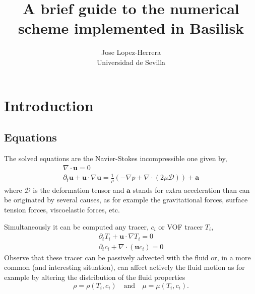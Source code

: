 \documentclass[a4paper]{report}
\begin{document}

\title{A brief guide to the numerical scheme implemented in Basilisk}
\author{Jose Lopez-Herrera \\ Universidad de Sevilla}
\maketitle
\chapter{Introduction}
\section{Equations}
The solved equations are the Navier-Stokes incompressible one given by,
\begin{gather}
\nabla \cdot \mathbf{u} = 0 \\
\partial_t \mathbf{u} + \mathbf{u} \cdot \nabla \mathbf{u} =  \frac{1}{\rho} \left(- \nabla p + \nabla \cdot ( 2\mu \mathcal{D}) \right) + \mathbf{a}
\end{gather}
where $\mathcal{D}$ is the deformation tensor and $\mathbf{a}$ stands for extra acceleration than can be originated by several causes, as for example the gravitational forces, surface tension forces, viscoelastic forces, etc.

Simultaneously it can be computed any tracer, $c_i$ or VOF tracer $T_i$,
\begin{gather}
\partial_t T_i + \mathbf{u} \cdot \nabla T_i = 0 \\
\partial_t c_i +   \nabla \cdot( \mathbf{u} c_i) = 0
\end{gather}
Observe that these tracer can be passively advected with the fluid or, in a more common (and interesting situation), can affect actively the fluid motion as for example by altering the distribution of the fluid properties
\begin{equation}
\rho = \rho (T_i,c_i) \quad \mbox{and} \quad \mu = \mu (T_i,c_i).
\end{equation}
\end{document}
